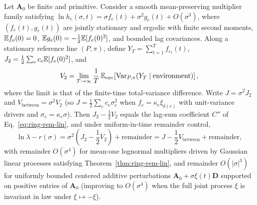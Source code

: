 \begin{theorem}\label{thm:bounds-lineage}
Let $\mathbf{A}_0$ be finite and primitive. Consider a smooth mean-preserving multiplier family satisfying $\ln h_e(\sigma, t) = \sigma f_e(t) + \sigma^2 g_e(t) + O(\sigma^3)$, where $(f_e(t), g_e(t))$ are jointly stationary and ergodic with finite second moments, $\mathbb{E} f_e(0) = 0$, $\mathbb{E} g_e(0) = -\frac{1}{2}\mathbb{E}[f_e(0)^2]$, and bounded lag covariances. Along a stationary reference line $(P, \pi)$, define $Y_T = \sum_{t=1}^T f_{e_t}(t)$, $J_2 = \frac{1}{2}\sum_e c_e \mathbb{E}[f_e(0)^2]$, and
\begin{equation}
V_2 = \lim_{T \to \infty} \frac{1}{T}\,\mathbb{E}_{\mathrm{env}}\!\left[\operatorname{Var}_{P,\pi}(Y_T \mid \text{environment})\right],
\label{eq:bounds-V2}
\end{equation}
where the limit is that of the finite-time total-variance difference. Write $J = \sigma^2 J_2$ and $V_{\mathrm{between}} = \sigma^2 V_2$ (so $J = \frac{1}{2}\sum_e c_e \sigma_e^2$ when $f_e = \kappa_e\xi_{\delta(e)}$ with unit-variance drivers and $\sigma_e = \kappa_e\sigma$). Then $J_2 - \frac{1}{2}V_2$ equals the lag-sum coefficient $C''$ of Eq.~\eqref{eq:ring-rem-lin}, and under uniform-in-time remainder control,
\begin{equation}
\ln\lambda - r(\sigma) = \sigma^2\left(J_2 - \frac{1}{2}V_2\right) + \text{remainder} = J - \frac{1}{2}V_{\mathrm{between}} + \text{remainder},
\label{eq:bounds-lineage}
\end{equation}
with remainder $O(\sigma^4)$ for mean-one lognormal multipliers driven by Gaussian linear processes satisfying Theorem~\ref{thm:ring-rem-lin}, and remainder $O(|\sigma|^3)$ for uniformly bounded centered additive perturbations $\mathbf{A}_0 + \sigma\xi(t)\mathbf{D}$ supported on positive entries of $\mathbf{A}_0$ (improving to $O(\sigma^4)$ when the full joint process $\xi$ is invariant in law under $\xi \mapsto -\xi$).
\end{theorem}


